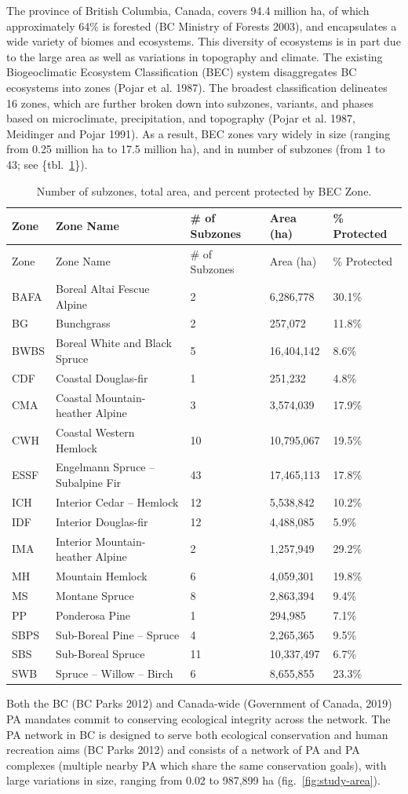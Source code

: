 \documentclass[11pt]{article}
\begin{document}
The province of British Columbia, Canada, covers 94.4 million ha, of
which approximately 64\% is forested (BC Ministry of Forests 2003), and
encapsulates a wide variety of biomes and ecosystems. This diversity of
ecosystems is in part due to the large area as well as variations in
topography and climate. The existing Biogeoclimatic Ecosystem
Classification (BEC) system disaggregates BC ecosystems into zones
(Pojar et al. 1987). The broadest classification delineates 16 zones,
which are further broken down into subzones, variants, and phases based
on microclimate, precipitation, and topography (Pojar et al. 1987,
Meidinger and Pojar 1991). As a result, BEC zones vary widely in size
(ranging from 0.25 million ha to 17.5 million ha), and in number of
subzones (from 1 to 43; see \{tbl.~\ref{tbl:bec-table}\}).

\hypertarget{tbl:bec-table}{}
\begin{longtable}[]{@{}lllll@{}}
\caption{\label{tbl:bec-table}Number of subzones, total area, and
percent protected by BEC Zone.}\tabularnewline
\toprule
Zone & Zone Name & \# of Subzones & Area (ha) & \%
Protected\tabularnewline
\midrule
\endfirsthead
\toprule
Zone & Zone Name & \# of Subzones & Area (ha) & \%
Protected\tabularnewline
\midrule
\endhead
BAFA & Boreal Altai Fescue Alpine & 2 & 6,286,778 &
30.1\%\tabularnewline
BG & Bunchgrass & 2 & 257,072 & 11.8\%\tabularnewline
BWBS & Boreal White and Black Spruce & 5 & 16,404,142 &
8.6\%\tabularnewline
CDF & Coastal Douglas-fir & 1 & 251,232 & 4.8\%\tabularnewline
CMA & Coastal Mountain-heather Alpine & 3 & 3,574,039 &
17.9\%\tabularnewline
CWH & Coastal Western Hemlock & 10 & 10,795,067 & 19.5\%\tabularnewline
ESSF & Engelmann Spruce -- Subalpine Fir & 43 & 17,465,113 &
17.8\%\tabularnewline
ICH & Interior Cedar -- Hemlock & 12 & 5,538,842 & 10.2\%\tabularnewline
IDF & Interior Douglas-fir & 12 & 4,488,085 & 5.9\%\tabularnewline
IMA & Interior Mountain-heather Alpine & 2 & 1,257,949 &
29.2\%\tabularnewline
MH & Mountain Hemlock & 6 & 4,059,301 & 19.8\%\tabularnewline
MS & Montane Spruce & 8 & 2,863,394 & 9.4\%\tabularnewline
PP & Ponderosa Pine & 1 & 294,985 & 7.1\%\tabularnewline
SBPS & Sub-Boreal Pine -- Spruce & 4 & 2,265,365 & 9.5\%\tabularnewline
SBS & Sub-Boreal Spruce & 11 & 10,337,497 & 6.7\%\tabularnewline
SWB & Spruce -- Willow -- Birch & 6 & 8,655,855 & 23.3\%\tabularnewline
\bottomrule
\end{longtable}

Both the BC (BC Parks 2012) and Canada-wide (Government of Canada, 2019)
PA mandates commit to conserving ecological integrity across the
network. The PA network in BC is designed to serve both ecological
conservation and human recreation aims (BC Parks 2012) and consists of a
network of PA and PA complexes (multiple nearby PA which share the same
conservation goals), with large variations in size, ranging from 0.02 to
987,899 ha (fig.~\ref{fig:study-area}).
\end{document}
